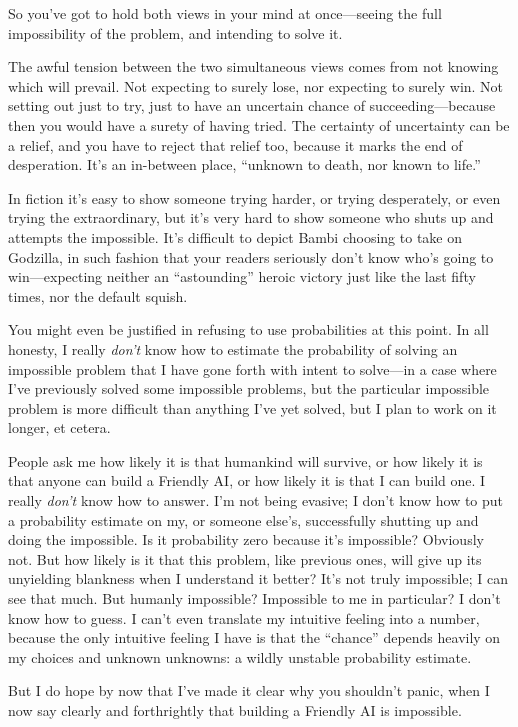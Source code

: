 {
 So you've got to hold both views in your mind at
once---seeing the full impossibility of the problem, and intending to
solve it.}

{
 The awful tension between the two simultaneous views comes from
not knowing which will prevail. Not expecting to surely lose, nor
expecting to surely win. Not setting out just to try, just to have an
uncertain chance of succeeding---because then you would have a surety
of having tried. The certainty of uncertainty can be a relief, and you
have to reject that relief too, because it marks the end of
desperation. It's an in-between place,
``unknown to death, nor known to
life.''}

{
 In fiction it's easy to show someone trying
harder, or trying desperately, or even trying the extraordinary, but
it's very hard to show someone who shuts up and
attempts the impossible. It's difficult to depict Bambi
choosing to take on Godzilla, in such fashion that your readers
seriously don't know who's going to
win---expecting neither an
``astounding'' heroic victory just
like the last fifty times, nor the default squish.}

{
 You might even be justified in refusing to use probabilities at
this point. In all honesty, I really \textit{don't}
know how to estimate the probability of solving an impossible problem
that I have gone forth with intent to solve---in a case where
I've previously solved some impossible problems, but
the particular impossible problem is more difficult than anything
I've yet solved, but I plan to work on it longer, et
cetera.}

{
 People ask me how likely it is that humankind will survive, or how
likely it is that anyone can build a Friendly AI, or how likely it is
that I can build one. I really \textit{don't} know how
to answer. I'm not being evasive; I
don't know how to put a probability estimate on my, or
someone else's, successfully shutting up and doing the
impossible. Is it probability zero because it's
impossible? Obviously not. But how likely is it that this problem, like
previous ones, will give up its unyielding blankness when I understand
it better? It's not truly impossible; I can see that
much. But humanly impossible? Impossible to me in particular? I
don't know how to guess. I can't even
translate my intuitive feeling into a number, because the only
intuitive feeling I have is that the
``chance'' depends heavily on my
choices and unknown unknowns: a wildly unstable probability estimate.}

{
 But I do hope by now that I've made it clear why
you shouldn't panic, when I now say clearly and
forthrightly that building a Friendly AI is impossible.}

